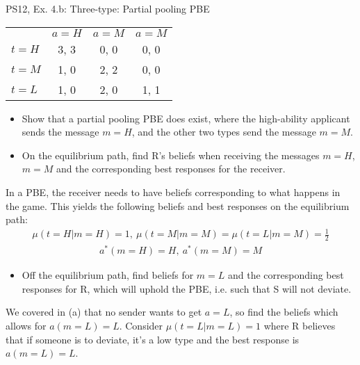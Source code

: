 \begin{frame}{PS12, Ex. 4.b: Three-type: Partial pooling PBE}
    \begin{table}
      \begin{tabular}{l|c|c|c|}
          \multicolumn{1}{c}{} & \multicolumn{1}{c}{$a=H$} & \multicolumn{1}{c}{$a=M$} & \multicolumn{1}{c}{$a=M$} \\\cline{2-4}
          $t=H$ & 3, 3 & 0, 0 & 0, 0 \\\cline{2-4}
          $t=M$ & 1, 0 & 2, 2 & 0, 0 \\\cline{2-4}
          $t=L$ & 1, 0 & 2, 0 & 1, 1 \\\cline{2-4}
      \end{tabular}
    \end{table}\vspace{-8pt}
    \begin{itemize}
      \item[(b)] Show that a partial pooling PBE does exist, where the high-ability applicant sends the message $m = H$, and the other two types send the message $m = M$.
      \item[Step 1:] On the equilibrium path, find R's beliefs when receiving the messages $m=H$, $m=M$ and the corresponding best responses for the receiver.
    \end{itemize}\vspace{-6pt}
    In a PBE, the receiver needs to have beliefs corresponding to what happens in the game. This yields the following beliefs and best responses on the equilibrium path:\vspace{-2pt}
    \begin{align*}
        \mu(t=H|m=H)=1,\
        \mu(t=M|m=M)=\mu(t=L|m=M)=\frac{1}{2}
    \end{align*}\vspace{-18pt}
    \begin{align*}
        a^*(m=H)=H,\ a^*(m=M)=M
    \end{align*}\vspace{-18pt}
    \begin{itemize}
      \item[Step 2:] Off the equilibrium path, find beliefs for $m=L$ and the corresponding best responses for R, which will uphold the PBE, i.e. such that S will not deviate.
    \end{itemize}\vspace{-6pt}
    We covered in (a) that no sender wants to get $a=L$, so find the beliefs which allows for $a(m=L)=L$. Consider $\mu(t=L|m=L)=1$ where R believes that if someone is to deviate, it's a low type and the best response is $a(m=L)=L$.\vspace{-2pt}

\end{frame}
